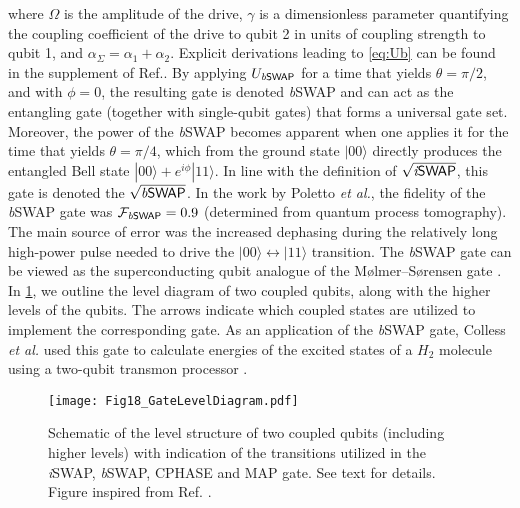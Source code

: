 \documentclass[aip,apr,twocolumn,showpacs,superscriptaddress,groupedaddress,nofootinbib,reprint]{revtex4-1}  %
\newcommand{\iSWAP}{\emph{i}\textsf{SWAP}}
\newcommand{\bSWAP}{\emph{b}\textsf{SWAP}}
\newcommand{\CPHASE}{\textsf{CPHASE}}
\newcommand{\etal}{\emph{et al.}}
\begin{document}
where $\Omega$ is the amplitude of the drive, $\gamma$ is a dimensionless parameter quantifying the coupling coefficient of the drive to qubit 2 in units of coupling strength to qubit 1, and $\alpha_\Sigma = \alpha_1 + \alpha_2$. Explicit derivations leading to \cref{eq:Ub} can be found in the supplement of Ref.. By applying $U_{\bSWAP{}}$ for a time that yields $\theta = \pi/2$, and with $\phi = 0$, the resulting gate is denoted \bSWAP{} and can act as the entangling gate (together with single-qubit gates) that forms a universal gate set. Moreover, the power of the \bSWAP{} becomes apparent when one applies it for the time that yields $\theta = \pi/4$, which from the ground state $|00\rangle$ directly produces the entangled Bell state $|00\rangle + e^{i\phi}|11\rangle$. In line with the definition of $\sqrt{\iSWAP{}}$, this gate is denoted the $\sqrt{\bSWAP{}}$. In the work by Poletto \etal{}\cite{Poletto2012}, the fidelity of the \bSWAP{} gate was $\mathcal F_{\bSWAP{}} = 0.9$ (determined from quantum process tomography). The main source of error was the increased dephasing during the relatively long high-power pulse needed to drive the $|00\rangle \leftrightarrow |11\rangle$ transition. The \bSWAP{} gate can be viewed as the superconducting qubit analogue of the M\o{}lmer--S\o{}rensen gate \cite{Molmer1999}. In \cref{fig:2qb_GatesLevelDiagram}, we outline the level diagram of two coupled qubits, along with the higher levels of the qubits. The arrows indicate which coupled states are utilized to implement the corresponding gate. As an application of the \bSWAP{} gate, Colless \etal{}\cite{Colless2018} used this gate to calculate energies of the excited states of a $H_2$ molecule using a two-qubit transmon processor \cite{Colless2018}.

\begin{figure}[!t]
\begin{center}
\texttt{[image: Fig18\_GateLevelDiagram.pdf]}
\caption{Schematic of the level structure of two coupled qubits (including higher levels) with indication of the transitions utilized in the \iSWAP{}, \bSWAP{}, \CPHASE{} and \textsf{MAP} gate. See text for details. Figure inspired from Ref. .}
\label{fig:2qb_GatesLevelDiagram}
\end{center}
\end{figure}
\end{document}
